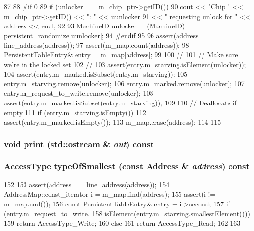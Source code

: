 \begin{DoxyCode}
87 {
88 #if 0
89     if (unlocker == m_chip_ptr->getID())
90         cout << "Chip " << m_chip_ptr->getID() << ": " << uunlocker
91              << " requesting unlock for " << address << endl;
92 
93     MachineID unlocker = (MachineID) persistent_randomize[uunlocker];
94 #endif
95 
96     assert(address == line_address(address));
97     assert(m_map.count(address));
98     PersistentTableEntry& entry = m_map[address];
99 
100     //
101     // Make sure we're in the locked set
102     //
103     assert(entry.m_starving.isElement(unlocker));
104     assert(entry.m_marked.isSubset(entry.m_starving));
105     entry.m_starving.remove(unlocker);
106     entry.m_marked.remove(unlocker);
107     entry.m_request_to_write.remove(unlocker);
108     assert(entry.m_marked.isSubset(entry.m_starving));
109 
110     // Deallocate if empty
111     if (entry.m_starving.isEmpty()) {
112         assert(entry.m_marked.isEmpty());
113         m_map.erase(address);
114     }
115 }
\end{DoxyCode}
\hypertarget{classPersistentTable_ac55fe386a101fbae38c716067c9966a0}{
\subsubsection[{print}]{\setlength{\rightskip}{0pt plus 5cm}void print (std::ostream \& {\em out}) const}}
\label{classPersistentTable_ac55fe386a101fbae38c716067c9966a0}
\hypertarget{classPersistentTable_ad8b7797f65c290ccfb5963c3770a03b3}{
\subsubsection[{typeOfSmallest}]{\setlength{\rightskip}{0pt plus 5cm}AccessType typeOfSmallest (const {\bf Address} \& {\em address}) const}}
\label{classPersistentTable_ad8b7797f65c290ccfb5963c3770a03b3}



\begin{DoxyCode}
152 {
153     assert(address == line_address(address));
154     AddressMap::const_iterator i = m_map.find(address);
155     assert(i != m_map.end());
156     const PersistentTableEntry& entry = i->second;
157     if (entry.m_request_to_write.
158         isElement(entry.m_starving.smallestElement())) {
159         return AccessType_Write;
160     } else {
161         return AccessType_Read;
162     }
163 }
\end{DoxyCode}


